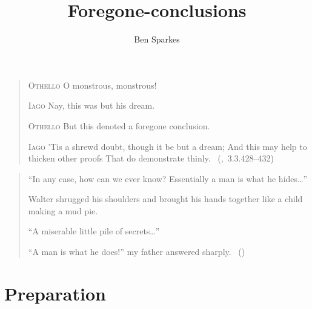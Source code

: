\documentclass[10pt]{report}
\title{
  Foregone-conclusions
}
\author{Ben Sparkes}
\begin{document}
\nocite{Lewis:1973aa}


\maketitle

\begin{quote}
  \textsc{Othello} O monstrous, monstrous!

  \textsc{Iago}\phantom{O monstrous, monstrous! Nay,} Nay, this was but his dream.

  \textsc{Othello} But this denoted a foregone conclusion.

  \textsc{Iago} 'Tis a shrewd doubt, though it be but a dream;\newline
  And this may help to thicken other proofs\newline
  That do demonstrate thinly.\newline
  \mbox{ }\hfill\mbox{(, 3.3.428--432)}
\end{quote}

\vfill

\begin{quote}
  ``In any case, how can we ever know? Essentially a man is what he hides\dots''

  Walter shrugged his shoulders and brought his hands together like a child making a mud pie.

  ``A miserable little pile of secrets\dots''

  ``A man is what he does!'' my father answered sharply.\newline
  \mbox{ }\hfill\mbox{(\cite[20]{Malraux:1968aa})}
\end{quote}

\tableofcontents

\newpage

\setcounter{chapter}{-1}

%



\part{Preparation}
\label{part:prep}






\end{document}
